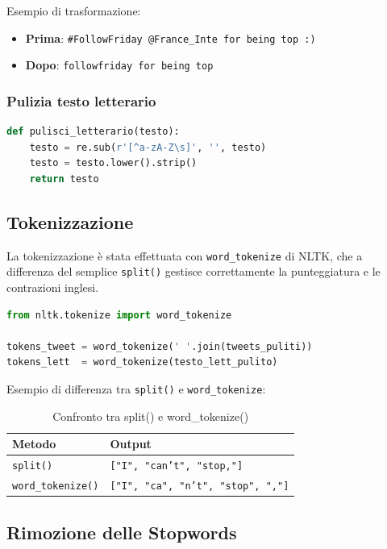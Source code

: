 \documentclass[12pt, a4paper]{article}
\begin{document}
Esempio di trasformazione:
\begin{itemize}
    \item \textbf{Prima}: \texttt{\#FollowFriday @France\_Inte for being top :)}
    \item \textbf{Dopo}: \texttt{followfriday for being top}
\end{itemize}

\subsubsection{Pulizia testo letterario}

\begin{lstlisting}[language=Python, caption=Funzione di pulizia testo letterario]
def pulisci_letterario(testo):
    testo = re.sub(r'[^a-zA-Z\s]', '', testo)
    testo = testo.lower().strip()
    return testo
\end{lstlisting}

\subsection{Tokenizzazione}

La tokenizzazione è stata effettuata con \texttt{word\_tokenize} di NLTK,
che a differenza del semplice \texttt{split()} gestisce correttamente
la punteggiatura e le contrazioni inglesi.

\begin{lstlisting}[language=Python, caption=Tokenizzazione]
from nltk.tokenize import word_tokenize

tokens_tweet = word_tokenize(' '.join(tweets_puliti))
tokens_lett  = word_tokenize(testo_lett_pulito)
\end{lstlisting}

Esempio di differenza tra \texttt{split()} e \texttt{word\_tokenize}:

\begin{table}[H]
\centering
\begin{tabular}{ll}
\toprule
\textbf{Metodo} & \textbf{Output} \\
\midrule
\texttt{split()} & \texttt{["I", "can't", "stop,"]} \\
\texttt{word\_tokenize()} & \texttt{["I", "ca", "n't", "stop", ","]} \\
\bottomrule
\end{tabular}
\caption{Confronto tra split() e word\_tokenize()}
\end{table}

\subsection{Rimozione delle Stopwords}
\end{document}
